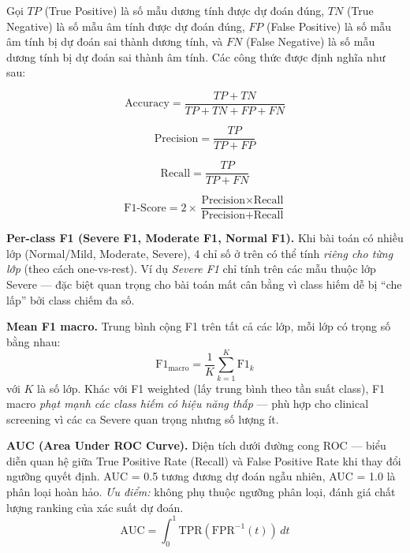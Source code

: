 Gọi $TP$ (True Positive) là số mẫu dương tính được dự đoán đúng, $TN$ (True Negative) là số mẫu âm tính được dự đoán đúng, $FP$ (False Positive) là số mẫu âm tính bị dự đoán sai thành dương tính, và $FN$ (False Negative) là số mẫu dương tính bị dự đoán sai thành âm tính. Các công thức được định nghĩa như sau:

\begin{equation}
    \text{Accuracy} = \frac{TP + TN}{TP + TN + FP + FN}
\end{equation}

\begin{equation}
    \text{Precision} = \frac{TP}{TP + FP}
\end{equation}

\begin{equation}
    \text{Recall} = \frac{TP}{TP + FN}
\end{equation}

\begin{equation}
    \text{F1-Score} = 2 \times \frac{\text{Precision} \times \text{Recall}}{\text{Precision} + \text{Recall}}
\end{equation}

\textbf{Per-class F1 (Severe F1, Moderate F1, Normal F1).} Khi bài toán có nhiều lớp (Normal/Mild, Moderate, Severe), 4 chỉ số ở trên có thể tính \emph{riêng cho từng lớp} (theo cách one-vs-rest). Ví dụ \textit{Severe F1} chỉ tính trên các mẫu thuộc lớp Severe --- đặc biệt quan trọng cho bài toán mất cân bằng vì class hiếm dễ bị ``che lấp'' bởi class chiếm đa số.

\textbf{Mean F1 macro.} Trung bình cộng F1 trên tất cả các lớp, mỗi lớp có trọng số bằng nhau:
\begin{equation}
    \text{F1}_{\text{macro}} = \frac{1}{K} \sum_{k=1}^{K} \text{F1}_k
\end{equation}
với $K$ là số lớp. Khác với F1 weighted (lấy trung bình theo tần suất class), F1 macro \emph{phạt mạnh các class hiếm có hiệu năng thấp} --- phù hợp cho clinical screening vì các ca Severe quan trọng nhưng số lượng ít.

\textbf{AUC (Area Under ROC Curve).} Diện tích dưới đường cong ROC --- biểu diễn quan hệ giữa True Positive Rate (Recall) và False Positive Rate khi thay đổi ngưỡng quyết định. AUC = 0.5 tương đương dự đoán ngẫu nhiên, AUC = 1.0 là phân loại hoàn hảo. \emph{Ưu điểm:} không phụ thuộc ngưỡng phân loại, đánh giá chất lượng ranking của xác suất dự đoán.
\begin{equation}
    \text{AUC} = \int_0^1 \text{TPR}(\text{FPR}^{-1}(t)) \, dt
\end{equation}

